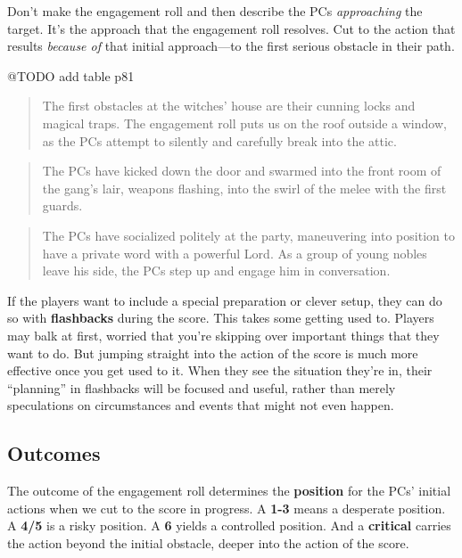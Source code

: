 \documentclass[11pt,fleqn,a5paper]{book}
\newcommand{\gameterm}[1]{\textbf{#1}}
\begin{document}
Don’t make the engagement roll and then describe the PCs \emph{approaching} the target. It’s the approach that the engagement roll resolves. Cut to the action that results \emph{because of} that initial approach---to the first serious obstacle in their path.

@TODO add table p81

\begin{quote}
	The first obstacles at the witches’ house are their cunning locks and magical traps. The engagement roll puts us on the roof outside a window, as the PCs attempt to silently and carefully break into the attic.
\end{quote} 

\begin{quote}
	The PCs have kicked down the door and swarmed into the front room of the gang’s lair, weapons flashing, into the swirl of the melee with the first guards.
\end{quote} 

\begin{quote}
	The PCs have socialized politely at the party, maneuvering into position to have a private word with a powerful Lord. As a group of young nobles leave his side, the PCs step up and engage him in conversation.
\end{quote} 

If the players want to include a special preparation or clever setup, they can do so with \textbf{flashbacks} during the score. This takes some getting used to. Players may balk at first, worried that you’re skipping over important things that they want to do. But jumping straight into the action of the score is much more effective once you get used to it. When they see the situation they’re in, their “planning” in flashbacks will be focused and useful, rather than merely speculations on circumstances and events that might not even happen.

\subsection{Outcomes}

The outcome of the engagement roll determines the \textbf{position} for the PCs’ initial actions when we cut to the score in progress. A \gameterm{1-3}  means a desperate position. A \gameterm{4/5}  is a risky position. A \gameterm{6}  yields a controlled position. And a \gameterm{critical}  carries the action beyond the initial obstacle, deeper into the action of the score.
\end{document}
